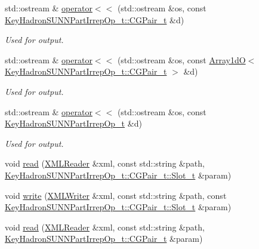 \begin{DoxyCompactItemize}
std\+::ostream \& \mbox{\hyperlink{namespaceHadron_a7fcec969c306a089eacf2f042ea60ba0}{operator$<$$<$}} (std\+::ostream \&os, const \mbox{\hyperlink{structHadron_1_1KeyHadronSUNNPartIrrepOp__t_1_1CGPair__t}{Key\+Hadron\+S\+U\+N\+N\+Part\+Irrep\+Op\+\_\+t\+::\+C\+G\+Pair\+\_\+t}} \&d)
\begin{DoxyCompactList}\small\item\em Used for output. \end{DoxyCompactList}\item 
std\+::ostream \& \mbox{\hyperlink{namespaceHadron_a608c5684c94df31a4fd84527e9508b27}{operator$<$$<$}} (std\+::ostream \&os, const \mbox{\hyperlink{classADAT_1_1Array1dO}{Array1dO}}$<$ \mbox{\hyperlink{structHadron_1_1KeyHadronSUNNPartIrrepOp__t_1_1CGPair__t}{Key\+Hadron\+S\+U\+N\+N\+Part\+Irrep\+Op\+\_\+t\+::\+C\+G\+Pair\+\_\+t}} $>$ \&d)
\begin{DoxyCompactList}\small\item\em Used for output. \end{DoxyCompactList}\item 
std\+::ostream \& \mbox{\hyperlink{namespaceHadron_a4347887ac461374a85fd726b7dece87c}{operator$<$$<$}} (std\+::ostream \&os, const \mbox{\hyperlink{structHadron_1_1KeyHadronSUNNPartIrrepOp__t}{Key\+Hadron\+S\+U\+N\+N\+Part\+Irrep\+Op\+\_\+t}} \&d)
\begin{DoxyCompactList}\small\item\em Used for output. \end{DoxyCompactList}\item 
void \mbox{\hyperlink{namespaceHadron_a73f1c84ecf25af9f0187691f514b5570}{read}} (\mbox{\hyperlink{classADATXML_1_1XMLReader}{X\+M\+L\+Reader}} \&xml, const std\+::string \&path, \mbox{\hyperlink{structHadron_1_1KeyHadronSUNNPartIrrepOp__t_1_1CGPair__t_1_1Slot__t}{Key\+Hadron\+S\+U\+N\+N\+Part\+Irrep\+Op\+\_\+t\+::\+C\+G\+Pair\+\_\+t\+::\+Slot\+\_\+t}} \&param)
\item 
void \mbox{\hyperlink{namespaceHadron_aeeb688cdcca0a8494272d68cf2f15481}{write}} (\mbox{\hyperlink{classADATXML_1_1XMLWriter}{X\+M\+L\+Writer}} \&xml, const std\+::string \&path, const \mbox{\hyperlink{structHadron_1_1KeyHadronSUNNPartIrrepOp__t_1_1CGPair__t_1_1Slot__t}{Key\+Hadron\+S\+U\+N\+N\+Part\+Irrep\+Op\+\_\+t\+::\+C\+G\+Pair\+\_\+t\+::\+Slot\+\_\+t}} \&param)
\item 
void \mbox{\hyperlink{namespaceHadron_adc5eb75838fc176e1641d6264c9a894d}{read}} (\mbox{\hyperlink{classADATXML_1_1XMLReader}{X\+M\+L\+Reader}} \&xml, const std\+::string \&path, \mbox{\hyperlink{structHadron_1_1KeyHadronSUNNPartIrrepOp__t_1_1CGPair__t}{Key\+Hadron\+S\+U\+N\+N\+Part\+Irrep\+Op\+\_\+t\+::\+C\+G\+Pair\+\_\+t}} \&param)

\end{DoxyCompactItemize}
